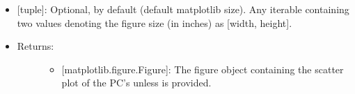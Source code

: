 \documentclass[letterpaper,10pt,english]{sphinxmanual}
\begin{document}
\begin{fulllineitems}
\begin{itemize}
\begin{description}
\begin{itemize}
\item {} 
 {[}tuple{]}: Optional,  by default (default
matplotlib size). Any iterable containing two values denoting
the figure size (in inches) as {[}width, height{]}.

\end{itemize}

\end{description}

\end{itemize}
\begin{itemize}
\item {} \begin{description}
\item[{Returns:}] \leavevmode\begin{itemize}
\item {} 
{[}matplotlib.figure.Figure{]}: The figure object containing the
scatter plot of the PC’s unless  is provided.

\end{itemize}

\end{description}

\end{itemize}

\end{fulllineitems}

\end{document}
